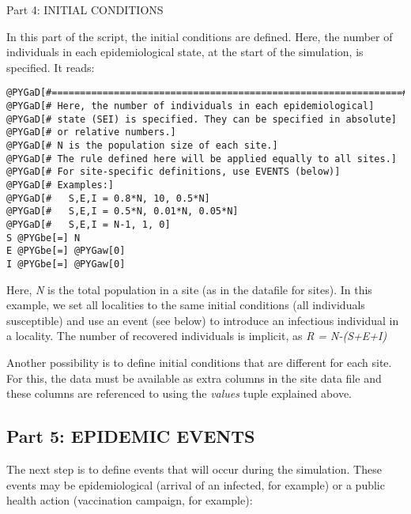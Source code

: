 \documentclass[a4paper,10pt]{manual}
\begin{document}
Part 4: INITIAL CONDITIONS

In this part of the script, the initial conditions are defined. Here, the number of individuals in each epidemiological state, at the start of the simulation, is specified. It reads:

\begin{Verbatim}[commandchars=@\[\]]
@PYGaD[#==============================================================#]
@PYGaD[# Here, the number of individuals in each epidemiological]
@PYGaD[# state (SEI) is specified. They can be specified in absolute]
@PYGaD[# or relative numbers.]
@PYGaD[# N is the population size of each site.]
@PYGaD[# The rule defined here will be applied equally to all sites.]
@PYGaD[# For site-specific definitions, use EVENTS (below)]
@PYGaD[# Examples:]
@PYGaD[#   S,E,I = 0.8*N, 10, 0.5*N]
@PYGaD[#   S,E,I = 0.5*N, 0.01*N, 0.05*N]
@PYGaD[#   S,E,I = N-1, 1, 0]
S @PYGbe[=] N
E @PYGbe[=] @PYGaw[0]
I @PYGbe[=] @PYGaw[0]
\end{Verbatim}

Here, \emph{N} is the total population in a site (as in the datafile for sites). In this example, we set all localities to the same initial conditions (all individuals susceptible) and use an event (see below) to introduce an infectious individual in a locality. The number of recovered individuals is implicit, as \emph{R = N-(S+E+I)}

Another possibility is to define initial conditions that are different for each site. For this, the data must be available as extra columns in the site data file and these columns are referenced to using the \emph{values} tuple explained above.


\subsection{Part 5: EPIDEMIC EVENTS}

The next step is to define events that will occur during the simulation. These events may be epidemiological (arrival of an infected, for example) or a public health action (vaccination campaign, for example):
\end{document}
